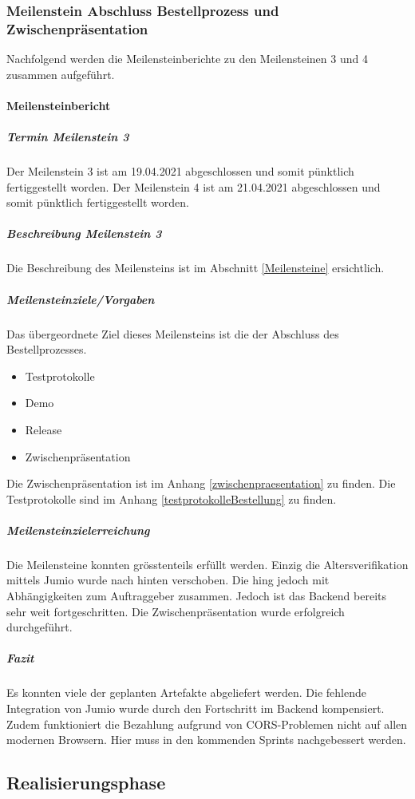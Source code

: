 \subsubsection{Meilenstein Abschluss Bestellprozess und Zwischenpräsentation}
Nachfolgend werden die Meilensteinberichte zu den Meilensteinen 3 und 4 zusammen aufgeführt. 
 \paragraph{Meilensteinbericht}
 \subparagraph{Termin Meilenstein 3}
 Der Meilenstein 3 ist am 19.04.2021 abgeschlossen und somit pünktlich fertiggestellt worden.
 Der Meilenstein 4 ist am 21.04.2021 abgeschlossen und somit pünktlich fertiggestellt worden. 
 \subparagraph{Beschreibung Meilenstein 3}
 Die Beschreibung des Meilensteins ist im Abschnitt \ref{Meilensteine} ersichtlich. 
 \subparagraph{Meilensteinziele/Vorgaben}
Das übergeordnete Ziel dieses Meilensteins ist die der Abschluss des Bestellprozesses. 
 \begin{itemize}
 	\item Testprotokolle
 	\item Demo
 	\item Release 
 	\item Zwischenpräsentation
 \end{itemize}
Die Zwischenpräsentation ist im Anhang \ref{zwischenpraesentation} zu finden. 
Die Testprotokolle sind im Anhang \ref{testprotokolleBestellung} zu finden. 
 \subparagraph{Meilensteinzielerreichung}
Die Meilensteine konnten grösstenteils erfüllt werden. Einzig die Altersverifikation mittels Jumio wurde nach hinten verschoben. Die hing jedoch mit Abhängigkeiten zum Auftraggeber zusammen. Jedoch ist das Backend bereits sehr weit fortgeschritten.  
Die Zwischenpräsentation wurde erfolgreich durchgeführt. 
 \subparagraph{Fazit}
Es konnten viele der geplanten Artefakte abgeliefert werden. Die fehlende Integration von Jumio wurde durch den Fortschritt im Backend kompensiert. Zudem funktioniert die Bezahlung aufgrund von CORS-Problemen nicht auf allen modernen Browsern. Hier muss in den kommenden Sprints nachgebessert werden. 

\subsection{Realisierungsphase}
